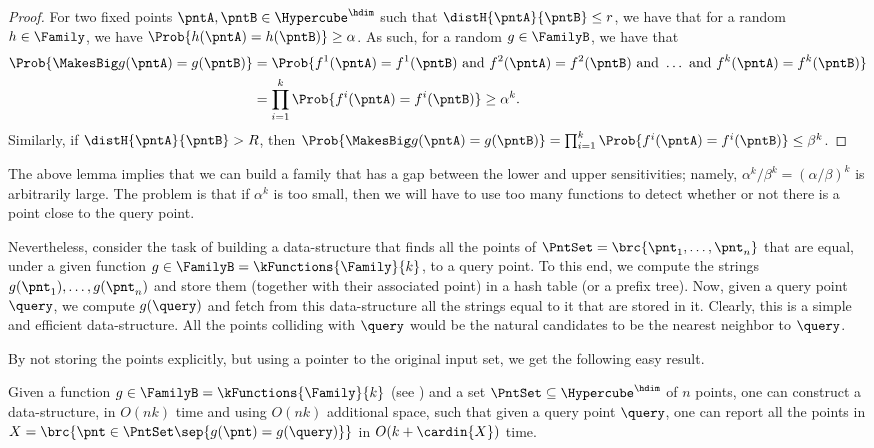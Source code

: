 \begin{proof}
    For two fixed points $\pntA, \pntB \in \Hypercube^\hdim$ such that
    $\distH{\pntA}{\pntB} \leq r$, we have that for a random $h \in
    \Family$, we have $\Prob{h(\pntA) = h(\pntB) } \geq \alpha$. As
    such, for a random $g \in \FamilyB$, we have that
    \begin{align*}
        \Prob{ \MakesBig g(\pntA) = g(\pntB) }%
        &=%
        \Prob{ f^1(\pntA) = f^1(\pntB) \text{ and } f^2(\pntA)%
           = f^2(\pntB) \text{ and } \ldots \text{ and } f^k(\pntA) =
           f^k(\pntB)}%
        \\
        &=%
        \prod_{i=1}^k \Prob{f^i(\pntA) = f^i(\pntB)} \geq \alpha^k.
    \end{align*}
    Similarly, if $\distH{\pntA}{\pntB} > R$, then $\Prob{\MakesBig
       g(\pntA) = g(\pntB) } = \prod_{i=1}^k \Prob{f^i(\pntA) =
       f^i(\pntB)} \leq \beta^k$.
\end{proof}

The above lemma implies that we can build a family that has a gap
between the lower and upper sensitivities; namely, $\alpha^k /\beta^k
= (\alpha/\beta)^k$ is arbitrarily large. The problem is that if
$\alpha^k$ is too small, then we will have to use too many functions
to detect whether or not there is a point close to the query point.

Nevertheless, consider the task of building a data-structure that
finds all the points of $\PntSet = \brc{\pnt_1, \ldots, \pnt_n}$ that
are equal, under a given function $g \in \FamilyB =
\kFunctions{\Family}{k}$, to a query point. To this end, we compute
the strings $g(\pnt_1), \ldots, g(\pnt_n)$ and store them (together
with their associated point) in a hash table (or a prefix tree). Now,
given a query point $\query$, we compute $g(\query)$ and fetch from
this data-structure all the strings equal to it that are stored in it.
Clearly, this is a simple and efficient data-structure. All the points
colliding with $\query$ would be the natural candidates to be the
nearest neighbor to $\query$.

By not storing the points explicitly, but using a pointer to the
original input set, we get the following easy result.

\begin{lemma}    
    Given a function $g \in \FamilyB= \kFunctions{\Family}{k}$ (see
    ) and a set $\PntSet \subseteq \Hypercube^\hdim$
    of $n$ points, one can construct a data-structure, in $O(nk)$ time
    and using $O(nk)$ additional space, such that given a query point
    $\query$, one can report all the points in $X = \brc{ \pnt \in
       \PntSet \sep{ g(\pnt) = g(\query)}}$ in $O( k + \cardin{X} )$
    time.
\end{lemma}


